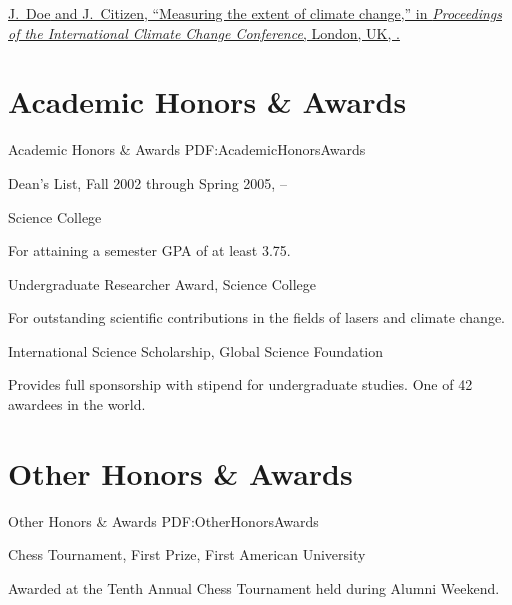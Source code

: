 \documentclass[a4paper,10pt,oneside]{article}
\begin{document}
\begin{body}
\EntryGap
{}
\href{http://www.example.com/my-paper-doi-1}
{\underline{J.~Doe} and J.~Citizen,
``Measuring the extent of climate change,''
in \textit{Proceedings of the International Climate Change Conference},
London, UK,
.}


\section
{Academic Honors\newline
\& Awards}
{Academic Honors \& Awards}
{PDF:AcademicHonorsAwards}

Dean's List,
Fall 2002 through Spring 2005,
\hfill
{} --
\par
Science College
\begin{detail}
For attaining a semester GPA of at least 3.75.
\end{detail}

\EntryGap
Undergraduate Researcher Award,
Science College
\hfill
{}
\begin{detail}
For outstanding scientific contributions in the fields of lasers and climate change.
\end{detail}

\EntryGap
International Science Scholarship,
Global Science Foundation
\hfill
{}
\begin{detail}
Provides full sponsorship with stipend for undergraduate studies.
One of 42 awardees in the world.
\end{detail}


\section
{Other Honors\newline
\& Awards}
{Other Honors \& Awards}
{PDF:OtherHonorsAwards}

Chess Tournament,
First Prize,
First American University
\hfill
{}
\begin{detail}
Awarded at the Tenth Annual Chess Tournament held during Alumni Weekend.
\end{detail}



\end{body}
\end{document}
